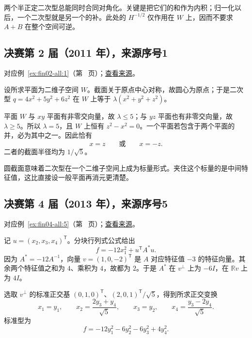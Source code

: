 \documentclass[UTF8,12pt,a4paper,fontset=fandol]{ctexart}
\begin{document}
\begin{remark}[方法与条件]

两个半正定二次型总能同时合同对角化。关键是把它们的和作为内积；归一化以后，一个二次型就是另一个的补。此处的 $H^{-1/2}$ 仅作用在 $W$ 上，因而不要求 $A+B$ 在整个空间可逆。

\end{remark}

\subsection{决赛第 2 届（2011 年），来源序号1}\label{ans:fin02-all:1}\label{pr:fin02-all:1}

对应例~\ref{ex:fin02-all:1}（第~\pageref{ex:fin02-all:1} 页）；\href{https://github.com/lzxcr/cmc-mathematics/blob/64916fa1fdbc3e444a652eca204d5669058ee321/src/problems/finals/02/01.md}{查看来源}。

\begin{solve}

设所求平面为二维子空间 $W$。截面关于原点中心对称，故圆心为原点；于是二次型
$q=4x^2+5y^2+6z^2$ 在 $W$ 上等于 $\lambda(x^2+y^2+z^2)$。

平面 $W$ 与 $xy$ 平面有非零交向量，故 $\lambda\le5$；与 $yz$ 平面也有非零交向量，故 $\lambda\ge5$。所以 $\lambda=5$，且 $W$ 上恒有 $z^2-x^2=0$。一个平面若包含于两个平面的并，必为其中之一。因此恰有
\[
x=z\qquad\text{或}\qquad x=-z.
\]
二者的截面半径均为 $1/\sqrt5$。

\end{solve}

\begin{remark}[方法与条件]

圆截面意味着二次型在一个二维子空间上成为标量形式。夹住这个标量的是中间特征值，这比直接设一般平面再消元更清楚。

\end{remark}

\subsection{决赛第 4 届（2013 年），来源序号5}\label{ans:fin04-all:5}\label{pr:fin04-all:5}

对应例~\ref{ex:fin04-all:5}（第~\pageref{ex:fin04-all:5} 页）；\href{https://github.com/lzxcr/cmc-mathematics/blob/64916fa1fdbc3e444a652eca204d5669058ee321/src/problems/finals/04/05.md}{查看来源}。

\begin{solve}

记 $u=(x_2,x_3,x_4)^{\mathsf T}$。分块行列式公式给出
\[
f=-12x_1^2+u^{\mathsf T}A^*u.
\]
因为 $A^*=-12A^{-1}$，向量 $v=(1,0,-2)^{\mathsf T}$ 是 $A$ 对应特征值 $-3$ 的特征向量。其余两个特征值之和为 $4$、乘积为 $4$，故都为 $2$。于是 $A^*$ 在 $v^\perp$ 上为 $-6I$，在 $\mathbb Rv$ 上为 $4I$。

选取 $v^\perp$ 的标准正交基 $(0,1,0)^{\mathsf T}$、$(2,0,1)^{\mathsf T}/\sqrt5$，得到所求正交变换
\[
x_1=y_1,\qquad x_2=\frac{2y_3+y_4}{\sqrt5},\qquad
x_3=y_2,\qquad x_4=\frac{y_3-2y_4}{\sqrt5}.
\]
标准型为
\[
f=-12y_1^2-6y_2^2-6y_3^2+4y_4^2.
\]

\end{solve}
\end{document}
